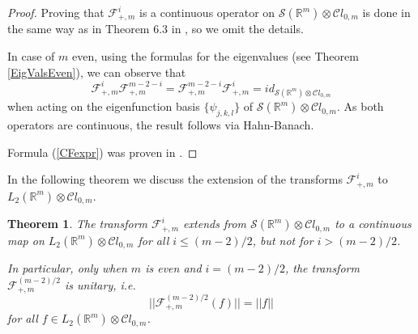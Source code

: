 \documentclass{amsart}
\newtheorem{theorem}{Theorem}[section]
\theoremstyle{remark}
\begin{document}
\begin{proof}
Proving that $\mathcal{F}^{i}_{+,m}$ is a continuous operator on $\mathcal{S}(\mathbb{R}^m) \otimes {\mathcal{C}} l_{0,m}$ is done in the same way as in Theorem 6.3 in \cite{DBXu}, so we omit the details.

In case of $m$ even, using the formulas for the eigenvalues (see Theorem \ref{EigValsEven}), we can observe that
\[
\mathcal{F}^{i}_{+,m} \mathcal{F}^{m-2-i}_{+,m} = \mathcal{F}^{m-2-i}_{+,m} \mathcal{F}^{i}_{+,m} = id_{\mathcal{S}(\mathbb{R}^m) \otimes {\mathcal{C}} l_{0,m}}
\]
when acting on the eigenfunction basis $\{ \psi_{j,k,l}\}$ of  $\mathcal{S}(\mathbb{R}^m) \otimes {\mathcal{C}} l_{0,m}$. As both operators are continuous, the result follows via Hahn-Banach. 

Formula (\ref{CFexpr}) was proven in \cite{DBXu}.
\end{proof}

In the following theorem we discuss the extension of the transforms $\mathcal{F}^{i}_{+,m}$ to $L_{2}(\mathbb{R}^m) \otimes {\mathcal{C}} l_{0,m}$.

\begin{theorem}
The transform $\mathcal{F}^{i}_{+,m}$ extends from $\mathcal{S}(\mathbb{R}^m) \otimes {\mathcal{C}} l_{0,m}$  to a continuous map on $L_{2}(\mathbb{R}^m) \otimes {\mathcal{C}} l_{0,m}$ for all $i  \leq (m-2)/2$, but not for $i > (m-2)/2$. 

In particular, only when $m$ is even and $i = (m-2)/2$, the transform $\mathcal{F}^{(m-2)/2}_{+,m}$ is unitary, i.e.
\[
||\mathcal{F}^{(m-2)/2}_{+,m} (f) || = ||f||
\]
for all $f \in L_{2}(\mathbb{R}^m) \otimes {\mathcal{C}} l_{0,m}$.
\end{theorem}
\end{document}
